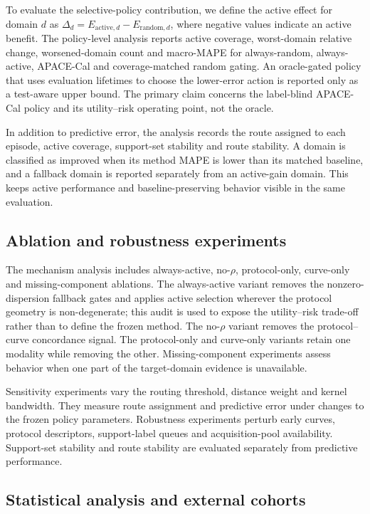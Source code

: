 \documentclass[preprint,12pt]{elsarticle}
\begin{document}
To evaluate the selective-policy contribution, we define the active effect for domain $d$ as $\Delta_d=E_{\mathrm{active},d}-E_{\mathrm{random},d}$, where negative values indicate an active benefit. The policy-level analysis reports active coverage, worst-domain relative change, worsened-domain count and macro-MAPE for always-random, always-active, APACE-Cal and coverage-matched random gating. An oracle-gated policy that uses evaluation lifetimes to choose the lower-error action is reported only as a test-aware upper bound. The primary claim concerns the label-blind APACE-Cal policy and its utility--risk operating point, not the oracle.

In addition to predictive error, the analysis records the route assigned to each episode, active coverage, support-set stability and route stability. A domain is classified as improved when its method MAPE is lower than its matched baseline, and a fallback domain is reported separately from an active-gain domain. This keeps active performance and baseline-preserving behavior visible in the same evaluation.

\subsection{Ablation and robustness experiments}

The mechanism analysis includes always-active, no-$\rho$, protocol-only, curve-only and missing-component ablations. The always-active variant removes the nonzero-dispersion fallback gates and applies active selection wherever the protocol geometry is non-degenerate; this audit is used to expose the utility--risk trade-off rather than to define the frozen method. The no-$\rho$ variant removes the protocol--curve concordance signal. The protocol-only and curve-only variants retain one modality while removing the other. Missing-component experiments assess behavior when one part of the target-domain evidence is unavailable.

Sensitivity experiments vary the routing threshold, distance weight and kernel bandwidth. They measure route assignment and predictive error under changes to the frozen policy parameters. Robustness experiments perturb early curves, protocol descriptors, support-label queues and acquisition-pool availability. Support-set stability and route stability are evaluated separately from predictive performance.

\subsection{Statistical analysis and external cohorts}
\end{document}
